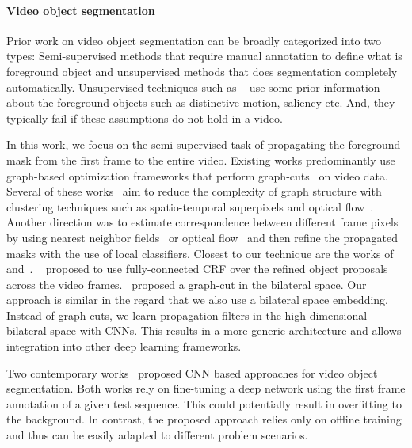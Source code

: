 \vspace{-0.3cm}
\paragraph{Video object segmentation}

Prior work on video object segmentation can be broadly categorized into two types:
Semi-supervised methods that require manual annotation to define what is foreground
object and unsupervised methods that does segmentation completely automatically.
Unsupervised techniques such as
~\cite{faktor2014video,li2013video,lee2011key,papazoglou2013fast,wang2015saliency,
zhang2013video,taylor2015causal,dondera2014interactive}
use some prior information about the foreground objects such as
distinctive motion, saliency etc. And, they typically fail if these
assumptions do not hold in a video.

In this work, we focus on the semi-supervised task of propagating the foreground
mask from the first frame to the entire video. Existing works
predominantly use graph-based optimization frameworks that perform graph-cuts~\cite{boykov2001fast,
boykov2001interactive,shi2000normalized} on video data.
Several of these works~\cite{reso2014interactive,
li2005video,price2009livecut,wang2005interactive,kohli2007dynamic,jain2014supervoxel}
aim to reduce the complexity of graph structure with
clustering techniques such as spatio-temporal superpixels and
optical flow~\cite{tsaivideo}.
Another direction was to estimate correspondence between different frame
pixels~\cite{agarwala2004keyframe,bai2009video,lang2012practical} by using
nearest neighbor fields~\cite{fan2015jumpcut} or optical flow~\cite{chuang2002video}
and then refine the propagated masks with the use of local classifiers.
Closest to our technique are the works of~\cite{perazzi2015fully} and~\cite{marki2016bilateral}.
~\cite{perazzi2015fully} proposed to use fully-connected CRF over the
refined object proposals across the video frames.~\cite{marki2016bilateral} proposed a
graph-cut in the bilateral space. Our approach is similar in the regard that we also
use a bilateral space embedding. Instead of graph-cuts, we learn
propagation filters in the high-dimensional bilateral space with CNNs.
This results in a more generic architecture and allows integration into other deep learning frameworks.

Two contemporary works~\cite{caelles2016one,khoreva2016learning} proposed CNN based
approaches for video object segmentation. Both works rely on fine-tuning a deep network
using the first frame annotation of a given test sequence. This could potentially result
in overfitting to the background.
In contrast, the proposed approach relies only on offline training and thus can be easily adapted
to different problem scenarios.

